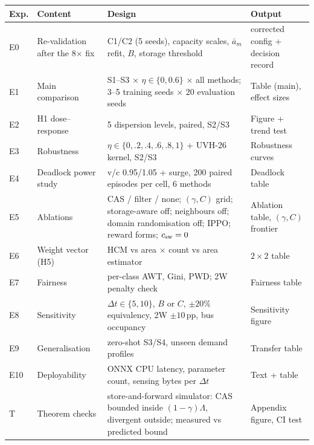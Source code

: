 \documentclass[11pt,a4paper]{article}
\begin{document}
\small
\begin{longtable}{@{}p{0.7cm}p{5.0cm}p{5.6cm}p{4.4cm}@{}}
\toprule
Exp. & Content & Design & Output \\
\midrule
\endhead
E0 & Re-validation after the 8$\times$ fix & C1/C2 (5 seeds), capacity scales,
  $\bar a_m$ refit, $B$, storage threshold & corrected config + decision record \\
E1 & Main comparison & S1--S3 $\times$ $\eta\in\{0,0.6\}$ $\times$ all methods; 3--5 training
  seeds $\times$ 20 evaluation seeds & Table (main), effect sizes \\
E2 & H1 dose--response & 5 dispersion levels, paired, S2/S3 & Figure + trend test \\
E3 & Robustness & $\eta\in\{0,.2,.4,.6,.8,1\}$ + UVH-26 kernel, S2/S3 & Robustness curves \\
E4 & Deadlock power study & v/c 0.95/1.05 + surge, 200 paired episodes per cell, 6 methods & Deadlock table \\
E5 & Ablations & CAS / filter / none; $(\gamma,C)$ grid; storage-aware off; neighbours off;
  domain randomisation off; IPPO; reward forms; $c_{\rm sw}=0$ & Ablation table, $(\gamma,C)$ frontier \\
E6 & Weight vector (H5) & HCM vs area $\times$ count vs area estimator & $2\times2$ table \\
E7 & Fairness & per-class AWT, Gini, PWD; 2W penalty check & Fairness table \\
E8 & Sensitivity & $\Delta t\in\{5,10\}$, $B$ or $C$, $\pm20\%$ equivalency, 2W $\pm10$\,pp,
  bus occupancy & Sensitivity figure \\
E9 & Generalisation & zero-shot S3/S4, unseen demand profiles & Transfer table \\
E10 & Deployability & ONNX CPU latency, parameter count, sensing bytes per $\Delta t$ & Text + table \\
T  & Theorem checks & store-and-forward simulator: CAS bounded inside
  $(1-\gamma)\Lambda$, divergent outside; measured vs predicted bound & Appendix figure, CI test \\
\bottomrule
\end{longtable}
\normalsize
\end{document}
